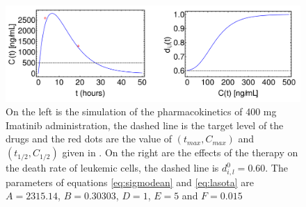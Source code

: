 \documentclass[a4paper,10pt]{article}
\begin{document}
\begin{figure}
\centering
\includegraphics[width=14cm] {farmaco-dy.pdf}
\caption{ On the left is the simulation 
of the pharmacokinetics of 400 mg Imatinib administration,
the dashed line is the target level of the  drugs and 
the red dots are the value of $(t_{max},C_{max})$ and $(t_{1/2},C_{1/2})$
given in \cite{pk-imatinib-2}.
On the right are the effects of the therapy on the death rate of leukemic cells,
the dashed  line is $d_{i,l}^0=0.60$. The parameters of equations 
\eqref{eq:sigmodean} and \eqref{eq:lasota} are $A=2315.14$, $B=0.30303$, $D=1$, $E=5$ and $F=0.015$}
\label{fig:dose} 
\end{figure}
\end{document}
